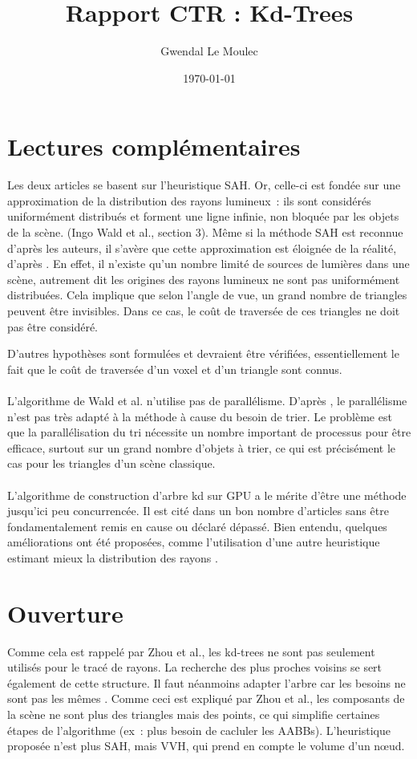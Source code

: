 \documentclass[a4paper]{article}
\title{Rapport CTR : Kd-Trees}
\author{Gwendal Le Moulec}
\date{\today}
\begin{document}
\section{Lectures complémentaires}

Les deux articles se basent sur l'heuristique SAH. Or, celle-ci est fondée sur une approximation de la distribution des rayons lumineux~: ils sont considérés uniformément distribués et forment une ligne infinie, non bloquée par les objets de la scène. (Ingo Wald et al., section 3). Même si la méthode SAH est reconnue d'après les auteurs, il s'avère que cette approximation est éloignée de la réalité, d'après \cite{anti-sah}. En effet, il n'existe qu'un nombre limité de sources de lumières dans une scène, autrement dit les origines des rayons lumineux ne sont pas uniformément distribuées. Cela implique que selon l'angle de vue, un grand nombre de triangles peuvent être invisibles. Dans ce cas, le coût de traversée de ces triangles ne doit pas être considéré.

D'autres hypothèses sont formulées et devraient être vérifiées, essentiellement le fait que le coût de traversée d'un voxel et d'un triangle sont connus.
\\\\
L'algorithme de Wald et al. n'utilise pas de parallélisme. D'après \cite{parallel-cpu}, le parallélisme n'est pas très adapté à la méthode à cause du besoin de trier. Le problème est que la parallélisation du tri nécessite un nombre important de processus pour être efficace, surtout sur un grand nombre d'objets à trier, ce qui est précisément le cas pour les triangles d'un scène classique.
\\\\
L'algorithme de construction d'arbre kd sur GPU a le mérite d'être une méthode jusqu'ici peu concurrencée. Il est cité dans un bon nombre d'articles sans être fondamentalement remis en cause ou déclaré dépassé. Bien entendu, quelques améliorations ont été proposées, comme l'utilisation d'une autre heuristique estimant mieux la distribution des rayons \cite{anti-sah}.

\section{Ouverture}
Comme cela est rappelé par Zhou et al., les kd-trees ne sont pas seulement utilisés pour le tracé de rayons. La recherche des plus proches voisins se sert également de cette structure. Il faut néanmoins adapter l'arbre  car les besoins ne sont pas les mêmes \cite{buffered-kdtree}. Comme ceci est expliqué par Zhou et al., les composants de la scène ne sont plus des triangles mais des points, ce qui simplifie certaines étapes de l'algorithme (ex~: plus besoin de cacluler les AABBs). L'heuristique proposée n'est plus SAH, mais VVH, qui prend en compte le volume d'un nœud.
\end{document}
